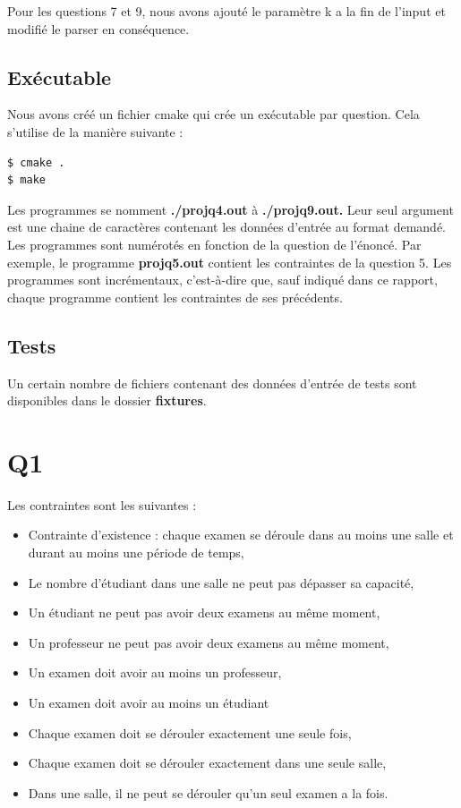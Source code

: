 \documentclass[a4paper,11pt]{article}
\begin{document}
Pour les questions 7 et 9, nous avons ajouté le paramètre k a la fin de l'input et modifié le parser en conséquence.

\subsection{Exécutable}

Nous avons créé un fichier cmake qui crée un exécutable par question.
Cela s'utilise de la manière suivante :
\begin{lstlisting}
$ cmake . 
$ make 
\end{lstlisting}
Les programmes se nomment \textbf{./projq4.out} à \textbf{./projq9.out.} Leur seul argument est une chaine de caractères contenant les données d'entrée au format demandé. Les programmes sont numérotés en fonction de la question de l'énoncé. Par exemple, le programme \textbf{projq5.out} contient les contraintes de la question 5.
Les programmes sont incrémentaux, c'est-à-dire que, sauf indiqué dans ce rapport, chaque programme contient les contraintes de ses précédents.

\subsection{Tests}
Un certain nombre de fichiers contenant des données d'entrée de tests sont disponibles dans le dossier \textbf{fixtures}.

\section{Q1}
Les contraintes sont les suivantes :
\begin{itemize}
  \item Contrainte d'existence : chaque examen se déroule dans au moins une salle et durant au moins une période de temps,
  \item Le nombre d'étudiant dans une salle ne peut pas dépasser sa capacité,
  \item Un étudiant ne peut pas avoir deux examens au même moment,
  \item Un professeur ne peut pas avoir deux examens au même moment,
  \item Un examen doit avoir au moins un professeur,
  \item Un examen doit avoir au moins un étudiant
  \item Chaque examen doit se dérouler exactement une seule fois,
  \item Chaque examen doit se dérouler exactement dans une seule salle,
  \item Dans une salle, il ne peut se dérouler qu'un seul examen a la fois.
\end{itemize}
\end{document}
